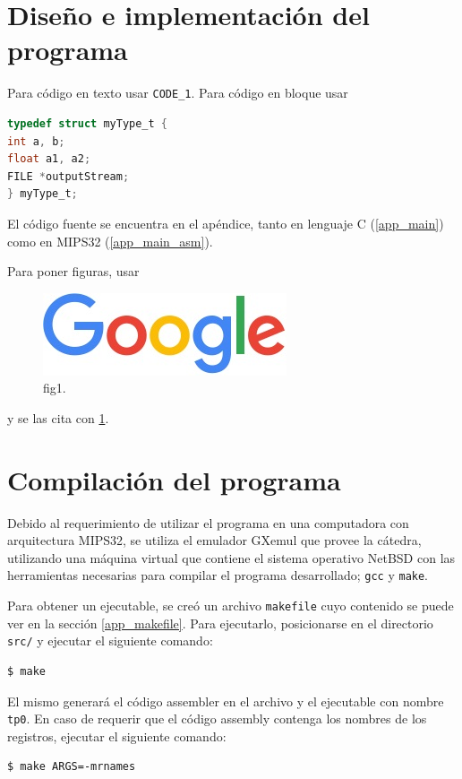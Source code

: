 \section{Diseño e implementación del programa}
Para código en texto usar \texttt{CODE\_1}.
Para código en bloque usar
\begin{lstlisting}[language=C, style=StyleC]
typedef struct myType_t {
int a, b;
float a1, a2;
FILE *outputStream;
} myType_t;
\end{lstlisting}

El código fuente se encuentra en el apéndice, tanto en lenguaje C (\ref{app_main}) como en MIPS32 (\ref{app_main_asm}).

Para poner figuras, usar
\begin{figure}[ht]
	\centering
	\includegraphics[scale=0.5]{./includes/fig1.jpg}
	\caption{fig1.}
	\label{fig1}
\end{figure}
y se las cita con \ref{fig1}.
\section{Compilación del programa}

Debido al requerimiento de utilizar el programa en una computadora con arquitectura MIPS32, se utiliza el emulador GXemul que provee la cátedra, utilizando una máquina virtual que contiene el sistema operativo NetBSD con las herramientas necesarias para compilar el programa desarrollado; \texttt{gcc} y \texttt{make}.

Para obtener un ejecutable, se creó un archivo \texttt{makefile} cuyo contenido se puede ver en la sección \ref{app_makefile}. Para ejecutarlo, posicionarse en el directorio \texttt{src/} y ejecutar el siguiente comando:
\begin{lstlisting}
$ make
\end{lstlisting}
El mismo generará el código assembler en el archivo  y el ejecutable con nombre \texttt{tp0}. En caso de requerir que el código assembly contenga los nombres de los registros, ejecutar el siguiente comando:
\begin{lstlisting}
$ make ARGS=-mrnames
\end{lstlisting}

